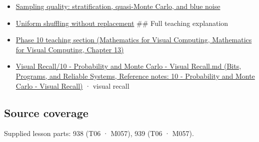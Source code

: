 \begin{itemize}
\item
  \hyperref[appendix-9f693ffd82bc]{Sampling quality: stratification, quasi-Monte Carlo, and blue noise}
\item
  \hyperref[appendix-184fcc411663]{Uniform shuffling without replacement} \#\# Full teaching explanation
\item
  \href{../02-Mathematics-for-Visual-Computing/main.pdf\#nameddest=02-foundations-ii-ch029-a-computer-produces-deterministic-pseudorandom-sequences}{Phase 10 teaching section (Mathematics for Visual Computing, Mathematics for Visual Computing, Chapter 13)}
\item
  \href{../01-Bits-Programs-and-Reliable-Systems/main.pdf\#nameddest=appendix-cb5af353ef77}{Visual Recall/10 - Probability and Monte Carlo - Visual Recall.md (Bits, Programs, and Reliable Systems, Reference notes: 10 - Probability and Monte Carlo - Visual Recall)} · visual recall
\end{itemize}

\subsection{Source coverage}\label{appendix-daaf25bfd3a0-source-coverage}

Supplied lesson parts: 938 (T06 · M057), 939 (T06 · M057).
